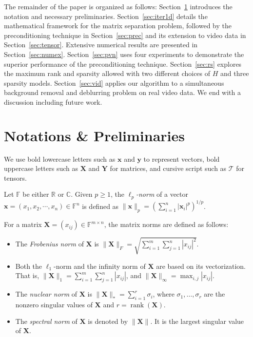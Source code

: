 \documentclass[10pt]{article}  	%
\theoremstyle{definition}
\theoremstyle{definition}
\newcommand{\R}{{\mathbb{R}}}
\newcommand{\C}{{\mathbb{C}}}
\newcommand{\F}{{\mathbb{F}}}
\newcommand{\vx}{\mathbf{x}}
\newcommand{\vy}{\mathbf{y}}
\newcommand{\mX}{\mathbf{X}}
\newcommand{\mY}{\mathbf{Y}}
\theoremstyle{remark}
\begin{document}

The remainder of the paper is organized as follows: Section~\ref{sec:prelim} introduces the notation and necessary preliminaries. Section~\ref{sec:iter1d} details the mathematical framework for the matrix separation problem, followed by the preconditioning technique in Section~\ref{sec:prec} and its extension to video data in Section~\ref{sec:tensor}. Extensive numerical results are presented in Section~\ref{sec:numex}. Section~\ref{sec:pvn} uses four experiments to demonstrate the superior performance of the preconditioning technique. Section~\ref{sec:rs} explores the maximum rank and sparsity allowed with two different choices of $H$ and three sparsity models. Section~\ref{sec:vid} applies our algorithm to a simultaneous background removal and deblurring problem on real video data. We end with a discussion including future work.

\section{Notations \& Preliminaries} \label{sec:prelim}

We use bold lowercase letters such as $\vx$ and $\vy$ to represent vectors, bold uppercase letters such as $\mX$ and $\mY$ for matrices, and cursive script such as $\boldsymbol{\mathcal{T}}$ for tensors.

Let $\F$ be either $\R$ or $\C$. Given $p \geq 1$, the \emph{$\ell_p$-norm} of a vector $\vx = (x_1, x_2, \cdots, x_n) \in \F^{n}$ is defined as $\|\vx\|_p = \left( \sum_{i=1}^n |\vx_i|^p \right)^{1/p}$.

For a matrix $\mX = (x_{ij}) \in \F^{m \times n}$, the matrix norms are defined as follows:
\begin{itemize}
\item The \emph{Frobenius norm} of $\mX$ is $\|\mX\|_F = \sqrt{\sum_{i=1}^m \sum_{j=1}^n |x_{ij}|^2}$.
\item Both the $\ell_1$-norm and the infinity norm of $\mX$ are based on its vectorization. That is, 
 $\|\mX\|_1 = \sum_{i=1}^m \sum_{j=1}^n |x_{ij}|$, and $\|\mX\|_\infty=\max_{i,j}|x_{ij}|$.
\item The \emph{nuclear norm} of $\mX$ is $\|\mX\|_* = \sum_{i=1}^r \sigma_i$, where $\sigma_1, \ldots, \sigma_r$ are the nonzero singular values of $\mX$ and $r = \operatorname{rank}(\mX)$.
\item The \emph{spectral norm} of $\mX$ is denoted by $\|\mX\|$. It is the largest singular value of $\mX$.
\end{itemize}
\end{document}
